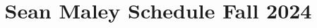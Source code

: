 \documentclass[11pt]{article} %
\begin{document}
\title{Sean Maley Schedule Fall 2024}
\author{}
\date{}
\maketitle
\vspace{-5em}
\begin{schedule}

	
	
\end{schedule}
\end{document}

